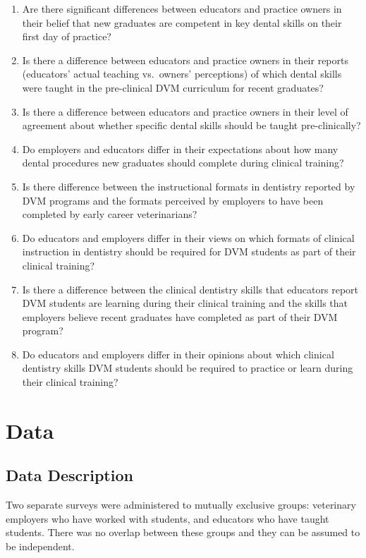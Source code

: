 \documentclass[
  11pt,
  letterpaper,
  DIV=11,
  numbers=noendperiod]{scrartcl}
\numberwithin{figure}{section}
\begin{document}
\begin{enumerate}
\def\labelenumi{\arabic{enumi}.}
\item
  Are there significant differences between educators and practice
  owners in their belief that new graduates are competent in key dental
  skills on their first day of practice?
\item
  Is there a difference between educators and practice owners in their
  reports (educators' actual teaching vs.~owners' perceptions) of which
  dental skills were taught in the pre-clinical DVM curriculum for
  recent graduates?
\item
  Is there a difference between educators and practice owners in their
  level of agreement about whether specific dental skills should be
  taught pre-clinically?
\item
  Do employers and educators differ in their expectations about how many
  dental procedures new graduates should complete during clinical
  training?
\item
  Is there difference between the instructional formats in dentistry
  reported by DVM programs and the formats perceived by employers to
  have been completed by early career veterinarians?
\item
  Do educators and employers differ in their views on which formats of
  clinical instruction in dentistry should be required for DVM students
  as part of their clinical training?
\item
  Is there a difference between the clinical dentistry skills that
  educators report DVM students are learning during their clinical
  training and the skills that employers believe recent graduates have
  completed as part of their DVM program?
\item
  Do educators and employers differ in their opinions about which
  clinical dentistry skills DVM students should be required to practice
  or learn during their clinical training?
\end{enumerate}

\section{Data}\label{data}

\subsection{Data Description}\label{data-description}

Two separate surveys were administered to mutually exclusive groups:
veterinary employers who have worked with students, and educators who
have taught students. There was no overlap between these groups and they
can be assumed to be independent.
\end{document}
